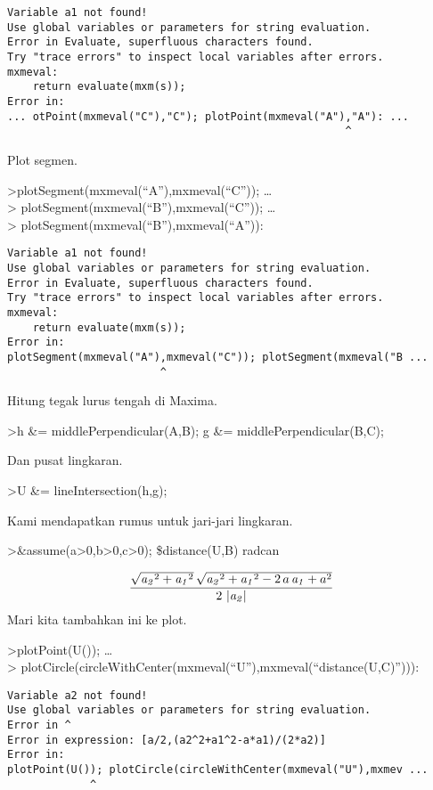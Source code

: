 \documentclass[
]{book}
\begin{document}
\begin{verbatim}
Variable a1 not found!
Use global variables or parameters for string evaluation.
Error in Evaluate, superfluous characters found.
Try "trace errors" to inspect local variables after errors.
mxmeval:
    return evaluate(mxm(s));
Error in:
... otPoint(mxmeval("C"),"C"); plotPoint(mxmeval("A"),"A"): ...
                                                     ^
\end{verbatim}

Plot segmen.

\textgreater plotSegment(mxmeval(``A''),mxmeval(``C'')); \ldots{}\\
\textgreater{} plotSegment(mxmeval(``B''),mxmeval(``C'')); \ldots{}\\
\textgreater{} plotSegment(mxmeval(``B''),mxmeval(``A'')):

\begin{verbatim}
Variable a1 not found!
Use global variables or parameters for string evaluation.
Error in Evaluate, superfluous characters found.
Try "trace errors" to inspect local variables after errors.
mxmeval:
    return evaluate(mxm(s));
Error in:
plotSegment(mxmeval("A"),mxmeval("C")); plotSegment(mxmeval("B ...
                        ^
\end{verbatim}

Hitung tegak lurus tengah di Maxima.

\textgreater h \&= middlePerpendicular(A,B); g \&= middlePerpendicular(B,C);

Dan pusat lingkaran.

\textgreater U \&= lineIntersection(h,g);

Kami mendapatkan rumus untuk jari-jari lingkaran.

\textgreater\&assume(a\textgreater0,b\textgreater0,c\textgreater0); \$distance(U,B) \textbar{} radcan

\[\frac{\sqrt{{\it a_2}^2+{\it a_1}^2}\,\sqrt{{\it a_2}^2+{\it a_1}^2 -2\,a\,{\it a_1}+a^2}}{2\,\left| {\it a_2}\right| }\]Mari kita tambahkan ini ke plot.

\textgreater plotPoint(U()); \ldots{}\\
\textgreater{} plotCircle(circleWithCenter(mxmeval(``U''),mxmeval(``distance(U,C)''))):

\begin{verbatim}
Variable a2 not found!
Use global variables or parameters for string evaluation.
Error in ^
Error in expression: [a/2,(a2^2+a1^2-a*a1)/(2*a2)]
Error in:
plotPoint(U()); plotCircle(circleWithCenter(mxmeval("U"),mxmev ...
             ^
\end{verbatim}
\end{document}
